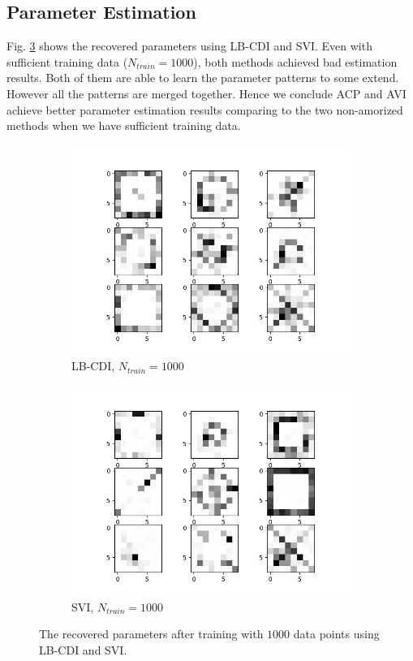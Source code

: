 \documentclass[twoside]{article}
\begin{document}
\subsection{Parameter Estimation}
Fig. \ref{fig: pattern_nonamortized} shows the recovered parameters using LB-CDI and SVI. Even with sufficient training data ($N_{train}=1000$), both methods achieved bad estimation results. Both of them are able to learn the parameter patterns to some extend. However all the patterns are merged together. Hence we conclude ACP and AVI achieve better parameter estimation results comparing to the two non-amorized methods when we have sufficient training data. 

\begin{figure}
    \centering
    \begin{subfigure}[t]{0.5\columnwidth}
    \includegraphics[width=1.0\linewidth]{lbcdi3.png}
    \caption{LB-CDI, $N_{train}=1000$}
    \label{fig: lbcdi_pattern}
    \end{subfigure}%
    \begin{subfigure}[t]{0.5\columnwidth}
    \includegraphics[width=1.0\linewidth]{svi_1000.png}
    \caption{SVI, $N_{train}=1000$}
    \label{fig: svi_pattern}
    \end{subfigure}
\caption{\small The recovered parameters after training with $1000$ data points using LB-CDI and SVI.}
\label{fig: pattern_nonamortized}
\end{figure}
\end{document}
